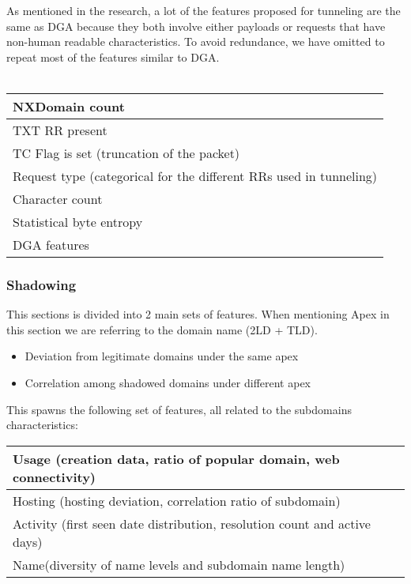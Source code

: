 As mentioned in the research, a lot of the features proposed for tunneling are the same as DGA because they both involve either payloads or requests that have non-human readable characteristics. To avoid redundance, we have omitted to repeat most of the features similar to DGA.\\\\
\begin{tabular}{|l|}
\hline
NXDomain count\\
\hline
TXT RR present\\
\hline 
TC Flag is set (truncation of the packet)\\
\hline
Request type (categorical for the different RRs used in tunneling)\\
\hline
Character count\\
\hline
Statistical byte entropy\\
\hline
DGA features\\
\hline
\end{tabular}

\subsubsection{Shadowing}

This sections is divided into 2 main sets of features. When mentioning Apex in this section we are referring to the domain name (2LD + TLD).
\begin{itemize}
\item Deviation from legitimate domains under the same apex
\item Correlation among shadowed domains under different apex 
\end{itemize}

This spawns the following set of features, all related to the subdomains characteristics:\\

\begin{tabular}{|l|}
\hline
Usage (creation data, ratio of popular domain, web connectivity) \\
\hline
Hosting (hosting deviation, correlation ratio of subdomain)\\
\hline
Activity (first seen date distribution, resolution count and active days)\\
\hline
Name(diversity of name levels and subdomain name length)\\
\hline
\end{tabular}


